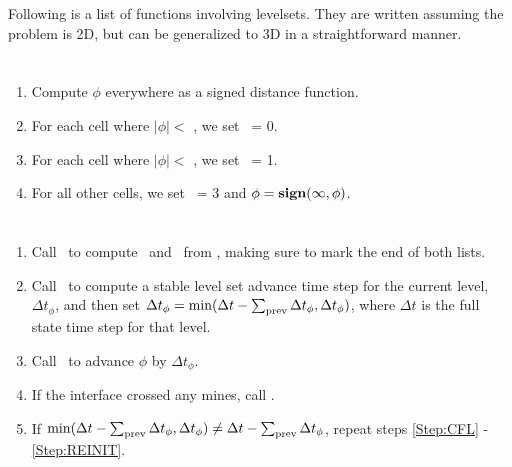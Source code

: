 Following is a list of functions involving levelsets.  They are written assuming the problem is 2D, but can be generalized to 3D in a straightforward manner.
\section{\INITPHI}
\begin{enumerate}
\item Compute $\phi$ everywhere as a signed distance function.
\item For each cell where $|\phi| <$ \mineloc, we set \type~= 0.
\item For each cell where $|\phi| <$ \nbandwidth, we set \type~= 1.
\item For all other cells, we set \type~= 3 and $\phi = {\tt{\bf sign}}(\infty,\phi)$.
\end{enumerate}
\section{\ADVANCE}
\begin{enumerate}
\item Call \NARROWBAND~to compute \nband~and \mine~from \type, making sure to mark the end of both lists.
\item \label{Step:CFL} Call \LSCFL~to compute a stable level set advance time step for the current level, $\Delta t_\phi$, and then set $\Delta t_\phi = \min(\Delta t-\sum_{\rm prev}\Delta t_\phi, \Delta t_\phi)$, where $\Delta t$ is the full state time step for that level.
\item Call \PHIUPD~to advance $\phi$ by $\Delta t_\phi$.
\item \label{Step:REINIT} If the interface crossed any mines, call \REINIT.
\item If $\min(\Delta t-\sum_{\rm prev}\Delta t_\phi, \Delta t_\phi) \ne \Delta t-\sum_{\rm prev}\Delta t_\phi$, repeat steps \ref{Step:CFL} - \ref{Step:REINIT}.
\end{enumerate}
